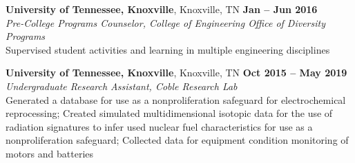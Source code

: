 \documentclass[margin,line]{resume}
\begin{document}
\begin{resume}
    \textbf{University of Tennessee, Knoxville}, Knoxville, TN \hfill \textbf{Jan -- Jun 2016}\vspace{1mm}\\
                \textsl{Pre-College Programs Counselor, College of Engineering Office of Diversity Programs}\\
                Supervised student activities and learning in multiple engineering disciplines

    \textbf{University of Tennessee, Knoxville}, Knoxville, TN \hfill \textbf{Oct 2015 -- May 2019}\vspace{1mm}\\
                \textsl{Undergraduate Research Assistant, Coble Research Lab}\\
                Generated a database for use as a nonproliferation safeguard for electrochemical reprocessing;
                Created simulated multidimensional isotopic data for the use of radiation signatures to infer 
                used nuclear fuel characteristics for use as a nonproliferation safeguard;
                Collected data for equipment condition monitoring of motors and batteries


\end{resume}
\end{document}
